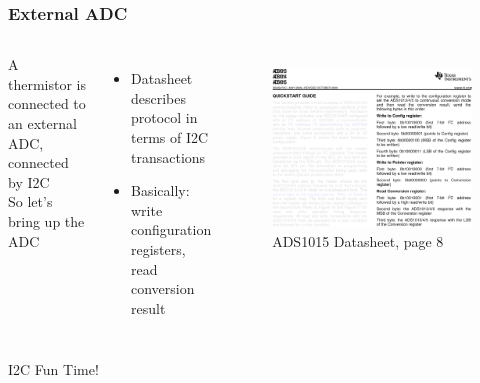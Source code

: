 \documentclass{beamer}
\begin{document}
\begin{frame}
\frametitle{External ADC}
\begin{columns}[t]
  A thermistor is connected to an external ADC, connected by I2C \\
  \hfill \break
  So let's bring up the ADC
  \begin{itemize}
    \item Datasheet describes protocol in terms of I2C transactions
    \item Basically: write configuration registers, read conversion result
  \end{itemize}
  \begin{figure}
    \centering
    \includegraphics[width = 0.9\columnwidth]{external/ads1015-p8-writeprocedure} \\
    ADS1015 Datasheet, page 8 \\

  \end{figure}
\end{columns}
\end{frame}

\begin{frame}
\centering \huge I2C Fun Time!
\end{frame}
\end{document}
